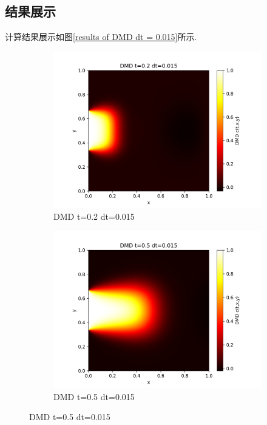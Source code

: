 \documentclass[11pt,a4 paper,one side]{article}
\begin{document}
\subsection{结果展示}
计算结果展示如图\ref{results of DMD dt = 0.015}所示.
\begin{figure}[htbp]
    \centering
    \begin{subfigure}{0.45\textwidth}
        \includegraphics[width=\textwidth]{DMD t=0.2 dt=0.015.png}
        \caption{DMD t=0.2 dt=0.015}
        \label{DMD t=0.2 dt=0.015}
    \end{subfigure}
    \hfill
    \begin{subfigure}{0.45\textwidth}
        \includegraphics[width=\textwidth]{DMD t=0.5 dt=0.015.png}
        \caption{DMD t=0.5 dt=0.015}
        \label{DMD t=0.5 dt=0.015}
    \end{subfigure}
    

\end{figure}
\end{document}
